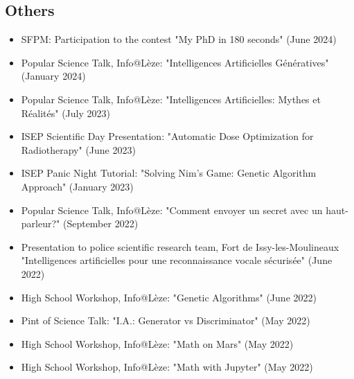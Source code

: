 \subsection*{Others}
\begin{itemize}
	\item SFPM: Participation to the contest "My PhD in 180 seconds" (June 2024)
	\item Popular Science Talk, Info@Lèze: "Intelligences Artificielles Génératives" (January 2024)
	\item Popular Science Talk, Info@Lèze: "Intelligences Artificielles: Mythes et Réalités" (July 2023)	\item ISEP Scientific Day Presentation: "Automatic Dose Optimization for Radiotherapy" (June 2023)
	\item ISEP Panic Night Tutorial: "Solving Nim's Game: Genetic Algorithm Approach" (January 2023)
	\item Popular Science Talk, Info@Lèze: "Comment envoyer un secret avec un haut-parleur?" (September 2022)
	\item Presentation to police scientific research team, Fort de Issy-les-Moulineaux "Intelligences artificielles pour une reconnaissance vocale sécurisée" (June 2022)
	\item High School Workshop, Info@Lèze: "Genetic Algorithms" (June 2022)
	\item Pint of Science Talk: "I.A.: Generator vs Discriminator" (May 2022)
	\item High School Workshop, Info@Lèze: "Math on Mars" (May 2022)
	\item High School Workshop, Info@Lèze: "Math with Jupyter" (May 2022)
\end{itemize}
